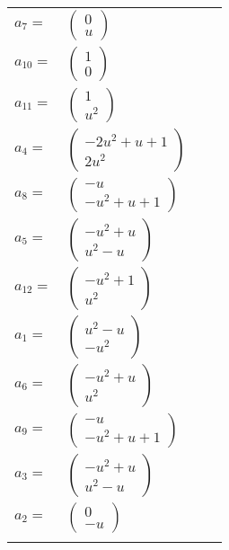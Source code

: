 \documentclass[1p]{elsarticle_modified}
\theoremstyle{definition}
\begin{document}
\begin{tabular}{m{7pt} m{180pt} m{7pt} m{180pt} }
\flushright $a_{7}=$&$\begin{pmatrix}0\\u\end{pmatrix}$ \\
\flushright $a_{10}=$&$\begin{pmatrix}1\\0\end{pmatrix}$ \\
\flushright $a_{11}=$&$\begin{pmatrix}1\\u^2\end{pmatrix}$ \\
\flushright $a_{4}=$&$\begin{pmatrix}-2 u^2+u+1\\2 u^2\end{pmatrix}$ \\
\flushright $a_{8}=$&$\begin{pmatrix}- u\\- u^2+u+1\end{pmatrix}$ \\
\flushright $a_{5}=$&$\begin{pmatrix}- u^2+u\\u^2- u\end{pmatrix}$ \\
\flushright $a_{12}=$&$\begin{pmatrix}- u^2+1\\u^2\end{pmatrix}$ \\
\flushright $a_{1}=$&$\begin{pmatrix}u^2- u\\- u^2\end{pmatrix}$ \\
\flushright $a_{6}=$&$\begin{pmatrix}- u^2+u\\u^2\end{pmatrix}$ \\
\flushright $a_{9}=$&$\begin{pmatrix}- u\\- u^2+u+1\end{pmatrix}$ \\
\flushright $a_{3}=$&$\begin{pmatrix}- u^2+u\\u^2- u\end{pmatrix}$ \\
\flushright $a_{2}=$&$\begin{pmatrix}0\\- u\end{pmatrix}$\\&\end{tabular}
\end{document}
